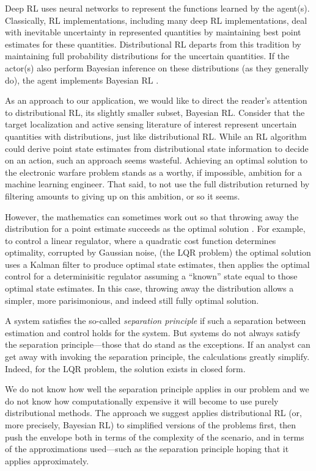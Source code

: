 \documentclass{article}
\begin{document}
Deep RL \cite{li2017deep} uses neural networks to represent the
functions learned by the agent(s).  Classically, RL implementations,
including many deep RL implementations, deal with inevitable
uncertainty in represented quantities by maintaining best point
estimates for these quantities.  Distributional RL
\cite{osband2018randomized} departs from this tradition by maintaining
full probability distributions for the uncertain quantities. If the
actor(s) also perform Bayesian inference on these distributions (as
they generally do), the agent implements Bayesian RL
\cite{ghavamzadeh2016bayesian}.

As an approach to our application, we would like to direct the
reader's attention to distributional RL, its slightly smaller subset,
Bayesian RL.  Consider that the target localization and active sensing
literature of interest represent uncertain quantities with
distributions, just like distributional RL.  While an RL algorithm
could derive point state estimates from distributional state
information to decide on an action, such an approach seems wasteful.
Achieving an optimal solution to the electronic warfare problem stands
as a worthy, if impossible, ambition for a machine learning engineer.
That said, to not use the full distribution returned by filtering
amounts to giving up on this ambition, or so it seems.

However, the mathematics can sometimes work out so that throwing away
the distribution for a point estimate succeeds as the optimal solution
\cite{aastrom2012introduction}.  For example, to control a linear
regulator, where a quadratic cost function determines optimality,
corrupted by Gaussian noise, (the LQR problem) the optimal solution
uses a Kalman filter to produce optimal state estimates, then applies
the optimal control for a determinisitic regulator assuming a
``known'' state equal to those optimal state estimates.  In this case,
throwing away the distribution allows a simpler, more parisimonious,
and indeed still fully optimal solution.

A system satisfies the so-called \emph{separation principle} if such a
separation between estimation and control holds for the system.  But
systems do not always satisfy the separation principle---those that do
stand as the exceptions.  If an analyst can get away with invoking the
separation principle, the calculations greatly simplify.  Indeed, for
the LQR problem, the solution exists in closed form.

We do not know how well the separation principle applies in our
problem and we do not know how computationally expensive it will
become to use purely distributional methods.  The approach we suggest
applies distributional RL (or, more precisely, Bayesian RL) to
simplified versions of the problems first, then push the envelope both
in terms of the complexity of the scenario, and in terms of the
approximations used---such as the separation principle hoping that it
applies approximately.
\end{document}
